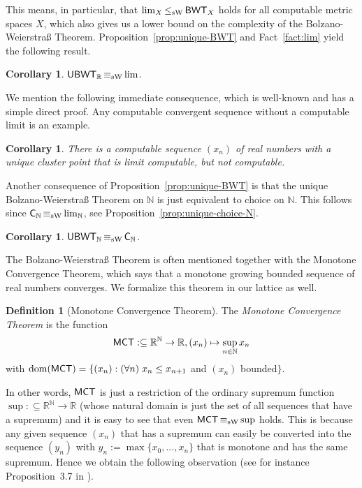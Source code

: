\documentclass[a4paper]{amsart}
\def\IN{{\mathbb{N}}}
\def\IR{{\mathbb{R}}}
\def\In{\subseteq}
\def\dom{{\rm dom}}
\def\BWT{\text{\rm\sffamily BWT}}
\def\C{\mbox{\rm\sffamily C}}
\def\MCT{\text{\rm\sffamily MCT}}
\def\UBWT{\text{\rm\sffamily UBWT}}
\def\leqSW{\mathop{\leq_{\mathrm{sW}}}}
\def\equivSW{\mathop{\equiv_{\mathrm{sW}}}}
\newtheorem{corollary}[theorem]{Corollary}
\theoremstyle{definition}
\newtheorem{definition}[theorem]{Definition}
\begin{document}
This means, in particular, that $\lim_X\leqSW\BWT_X$ holds for all computable metric spaces $X$,
which also gives us a lower bound on the complexity of the Bolzano-Weierstra\ss{} Theorem.
Proposition~\ref{prop:unique-BWT} and Fact~\ref{fact:lim}
yield the following result.

\begin{corollary}
\label{cor:UBWT-R}
$\UBWT_\IR\equivSW\lim$.
\end{corollary}

We mention the following immediate consequence, which is well-known and has a
simple direct proof. Any computable convergent sequence without
a computable limit is an example.

\begin{corollary}
\label{cor:UBWT-R-example}
There is a computable sequence $(x_n)$ of real numbers with a unique
cluster point that is limit computable, but not computable.
\end{corollary}

Another consequence of Proposition~\ref{prop:unique-BWT} is that the unique Bolzano-Weierstra\ss{} Theorem on $\IN$ is just
equivalent to choice on $\IN$. This follows since $\C_\IN\equivSW\lim_\IN$, see Proposition~\ref{prop:unique-choice-N}.

\begin{corollary}
\label{cor:UBWT-N}
$\UBWT_\IN\equivSW\C_\IN$.
\end{corollary}

The Bolzano-Weierstra\ss{} Theorem is often mentioned together with the Monotone Convergence Theorem, which
says that a monotone growing bounded sequence of real numbers converges. 
We formalize this theorem in our lattice as well.

\begin{definition}[Monotone Convergence Theorem]
The {\em Monotone Convergence Theorem} is the function
\[\MCT:\In\IR^\IN\to\IR,(x_n)\mapsto\sup_{n\in\IN}x_n\]
with $\dom(\MCT)=\{(x_n):(\forall n)\;x_n\leq x_{n+1}$ and $(x_n)$ bounded$\}$.
\end{definition}

In other words, $\MCT$ is just a restriction of the ordinary supremum function $\sup:\In\IR^\IN\to\IR$
(whose natural domain is just the set of all sequences that have a supremum) and it is easy
to see that even $\MCT\equivSW\sup$ holds. This is because any given sequence $(x_n)$ that 
has a supremum can easily be converted into the sequence $(y_n)$ with $y_n:=\max\{x_0,...,x_n\}$ that
is monotone and has the same supremum. Hence we obtain the following observation (see for instance
Proposition~3.7 in \cite{BG11a}).
\end{document}
